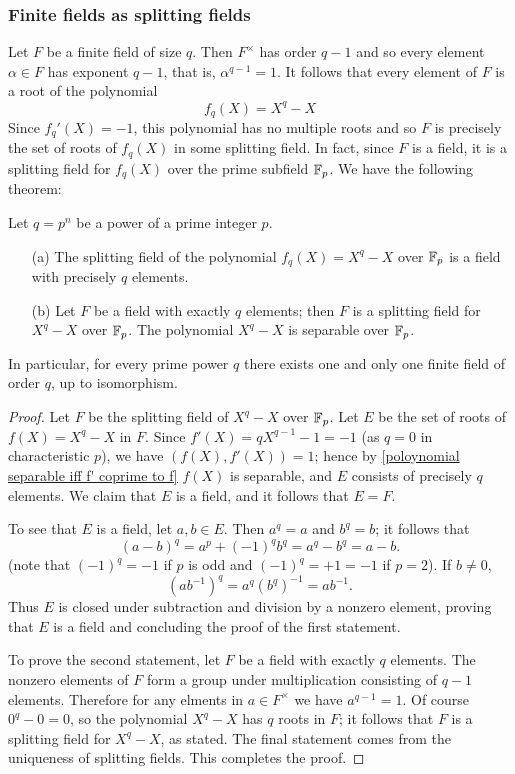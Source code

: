 \subsubsection{Finite fields as splitting fields}
Let $F$ be a finite field of size $q$. Then $F^\times$ has order $q-1$ and so every element $\alpha\in F$ has exponent $q-1$, that is, $\alpha^{q-1}=1$. It follows that every element of $F$ is a root of the polynomial
\[f_q(X)=X^q-X\]
Since $f_q'(X)=-1$, this polynomial has no multiple roots and so $F$ is precisely the set of roots of $f_q(X)$ in some splitting field. In fact, since $F$ is a field, it is a splitting field for $f_q(X)$ over the prime subfield $\mathbb{F}_p$. We have the following theorem:
\begin{theorem}\label{finite field p^n order extension char}
Let $q=p^n$ be a power of a prime integer $p$.
\begin{itemize}
\item[(a)] The splitting field of the polynomial $f_q(X)=X^{q}-X$ over $\mathbb{F}_p$ is a field with precisely $q$ elements.
\item[(b)] Let $F$ be a field with exactly $q$ elements; then $F$ is a splitting field for $X^q-X$ over $\mathbb{F}_p$. The polynomial $X^q-X$ is separable over $\mathbb{F}_p$.
\end{itemize}
In particular, for every prime power $q$ there exists one and only one finite field of order $q$, up to isomorphism.
\end{theorem}
\begin{proof}
Let $F$ be the splitting field of $X^q-X$ over $\mathbb{F}_p$. Let $E$ be the set of roots of $f(X)=X^q-X$ in $F$. Since $f'(X)=qX^{q-1}-1=-1$ (as $q=0$ in characteristic $p$), we have $(f(X),f'(X))=1$; hence by \cref{poloynomial separable iff f' coprime to f} $f(X)$ is separable, and $E$ consists of precisely $q$ elements. We claim that $E$ is a field, and it follows that $E=F$.\par
To see that $E$ is a field, let $a,b\in E$. Then $a^q=a$ and $b^q=b$; it follows that
\[(a-b)^q=a^p+(-1)^qb^q=a^q-b^q=a-b.\]
(note that $(-1)^q=-1$ if $p$ is odd and $(-1)^q=+1=-1$ if $p=2$). If $b\neq0$,
\[(ab^{-1})^q=a^q(b^q)^{-1}=ab^{-1}.\]
Thus $E$ is closed under subtraction and division by a nonzero element, proving that $E$ is a field and concluding the proof of the first statement.\par
To prove the second statement, let $F$ be a field with exactly $q$ elements. The nonzero elements of $F$ form a group under multiplication consisting of $q-1$ elements. Therefore for any elments in $a\in F^\times$ we have $a^{q-1}=1$. Of course $0^q-0=0$, so the polynomial $X^q-X$ has $q$ roots in $F$; it follows that $F$ is a splitting field for $X^q-X$, as stated. The final statement comes from the uniqueness of splitting fields. This completes the proof.
\end{proof}
